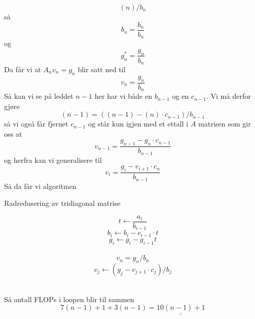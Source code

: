 \documentclass[english,notitlepage]{revtex4-1}  %
\begin{document}
$$
(n)/b_n
$$
så
$$
b_n=\frac{b_n}{b_n}
$$
og
$$
g_n^*=\frac{g_n}{b_n}
$$
Da får vi at
$
A_n v_n=g_n
$
blir satt ned til
$$
v_n=\frac{g_n}{b_n}
$$
Så kan vi se på leddet $n-1$ her har vi både en $b_{n-1}$ og en $c_{n-1}$. Vi må derfor gjøre $$(n-1)=((n-1)-(n)\cdot c_{n-1})/b_{n-1}$$ så vi også får fjernet $c_{n-1}$ og står kun igjen med et ettall i $A$ matrisen som gir oss at 
$$
v_{n-1}=\frac{g_{n-1}-g_n\cdot c_{n-1}}{b_{n-1}}
$$
og herfra kan vi generalisere til
$$
v_{i}=\frac{g_{i}-v_{i+1}\cdot c_{n}}{b_{n-1}}
$$
Så da får vi algoritmen
\begin{algorithm}[H]
	\caption{Radredusering av tridiagonal matrise}\label{algo:midpoint_rule}
	\begin{algorithmic}
		 
		\State $$t\leftarrow \frac{a_i}{b_{i-1}}$$ 
		$$
		b_{i}\leftarrow b_{i}-c_{i-1}\cdot t
		$$ 
		$$
		g_i\leftarrow g_i-g_{i-1} t
		$$  \\
		\EndFor
		\State $$
		v_n=g_n/b_n
		$$ 
		 
		\State
		$$
		v_j\leftarrow (g_j-v_{j+1}\cdot c_j)/b_j
		$$  \\
		\EndFor
	\end{algorithmic}
\end{algorithm}
Så antall FLOPs i loopen blir til sammen 
$$7(n-1)+1+3(n-1)=\underline{\underline{10(n-1)+1}}
$$
\end{document}
